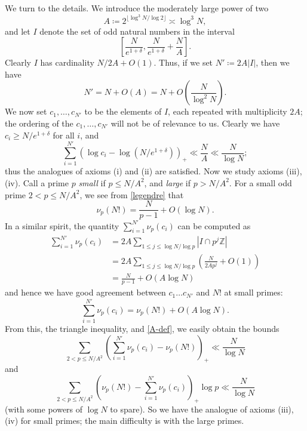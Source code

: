 \documentclass[12pt,a4paper,reqno]{amsart}
\numberwithin{equation}{section}
\theoremstyle{plain}
\theoremstyle{definition}
\newcommand\Z{\mathbb{Z}}
\begin{document}
We turn to the details.  We introduce the moderately large power of two
\begin{equation}\label{A-def}
   A \coloneqq 2^{\lfloor \log^3 N / \log 2 \rfloor} \asymp \log^3 N,
\end{equation}
and let $I$ denote the set of odd natural numbers in the interval
$$ \left[\frac{N}{e^{1+\delta}}, \frac{N}{e^{1+\delta}} + \frac{N}{A}\right].$$
Clearly $I$ has cardinality $N/2A + O(1)$.  Thus, if we set $N' \coloneqq 2A|I|$, then we have
\begin{equation}\label{N'-card}
  N' = N + O(A) = N + O\left( \frac{N}{\log^2 N}\right).
\end{equation}
We now set $c_1,\dots,c_{N'}$ to be the elements of $I$, each repeated with multiplicity $2A$; the ordering of the $c_1,\dots,c_{N'}$ will not be of relevance to us.  Clearly we have $c_i \geq N/e^{1+\delta}$ for all $i$, and
\begin{equation}\label{cii}
   \sum_{i=1}^{N'} (\log c_i - \log (N/e^{1+\delta}))_+ \ll \frac{N}{A} \ll \frac{N}{\log N};
\end{equation}
thus the analogues of axioms (i) and (ii) are satisfied.  Now we study axioms (iii), (iv).  Call a prime $p$ \emph{small} if $p \leq N/A^2$, and \emph{large} if $p > N/A^2$.  For a small odd prime $2 < p \leq N/A^2$, we see from \eqref{legendre} that
$$ \nu_p(N!) = \frac{N}{p-1} + O(\log N).$$
In a similar spirit, the quantity $\sum_{i=1}^{N'} \nu_p(c_i)$ can be computed as
\begin{align*}
  \sum_{i=1}^{N'} \nu_p(c_i) &= 2A \sum_{1 \leq j \leq \log N/\log p} |I \cap p^j \Z| \\
  &= 2A \sum_{1 \leq j \leq \log N/\log p} \left(\frac{N}{2Ap^j} + O(1)\right) \\
  &= \frac{N}{p-1} + O(A \log N)
\end{align*}
and hence we have good agreement between $c_1 \dots c_{N'}$ and $N!$ at small primes:
\begin{equation}\label{nupci}
   \sum_{i=1}^{N'} \nu_p(c_i) = \nu_p(N!) + O(A \log N).
\end{equation}
From this, the triangle inequality, and \eqref{A-def}, we easily obtain the bounds
\begin{equation}\label{ciii}
  \sum_{2 < p \leq N/A^2} \left(\sum_{i=1}^{N'} \nu_p(c_i) - \nu_p(N!)\right)_+ \ll \frac{N}{\log N}
\end{equation}
and
\begin{equation}\label{civ}
  \sum_{2 < p \leq N/A^2} \left(\nu_p(N!) - \sum_{i=1}^{N'} \nu_p(c_i)\right)_+ \log p \ll \frac{N}{\log N}
\end{equation}
(with some powers of $\log N$ to spare).  So we have the analogue of axioms (iii), (iv) for small primes; the main difficulty is with the large primes.
\end{document}
